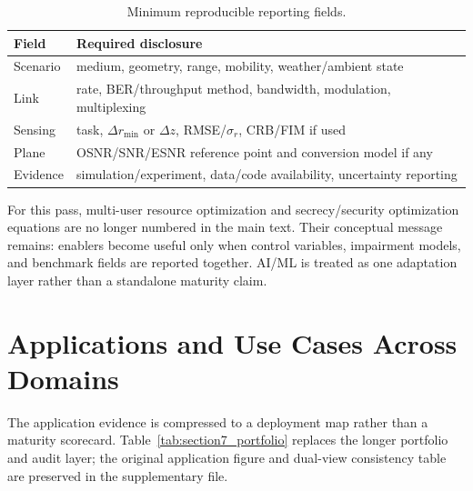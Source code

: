 \documentclass[letterpaper,journal]{IEEEtran}
\begin{document}
\begin{table}[!t]
    \caption{Minimum reproducible reporting fields.}
    \label{tab:vi_d_reporting}
    \centering
    \scriptsize
    \setlength{\tabcolsep}{2.5pt}
    \renewcommand{\arraystretch}{1.05}
    \begin{tabularx}{\linewidth}{@{}p{1.8cm}X@{}}
        \toprule
        Field & Required disclosure \\
        \midrule
        Scenario & medium, geometry, range, mobility, weather/ambient state \\
        Link & rate, BER/throughput method, bandwidth, modulation, multiplexing \\
        Sensing & task, $\Delta r_{\min}$ or $\Delta z$, RMSE/$\sigma_r$, CRB/FIM if used \\
        Plane & OSNR/SNR/ESNR reference point and conversion model if any \\
        Evidence & simulation/experiment, data/code availability, uncertainty reporting \\
        \bottomrule
    \end{tabularx}
\end{table}

For this pass, multi-user resource optimization and secrecy/security optimization equations are no longer numbered in the main text. Their conceptual message remains: enablers become useful only when control variables, impairment models, and benchmark fields are reported together. AI/ML is treated as one adaptation layer rather than a standalone maturity claim.

\section{Applications and Use Cases Across Domains}
\label{sec:applications}

The application evidence is compressed to a deployment map rather than a maturity scorecard. Table~\ref{tab:section7_portfolio} replaces the longer portfolio and audit layer; the original application figure and dual-view consistency table are preserved in the supplementary file.
\end{document}
